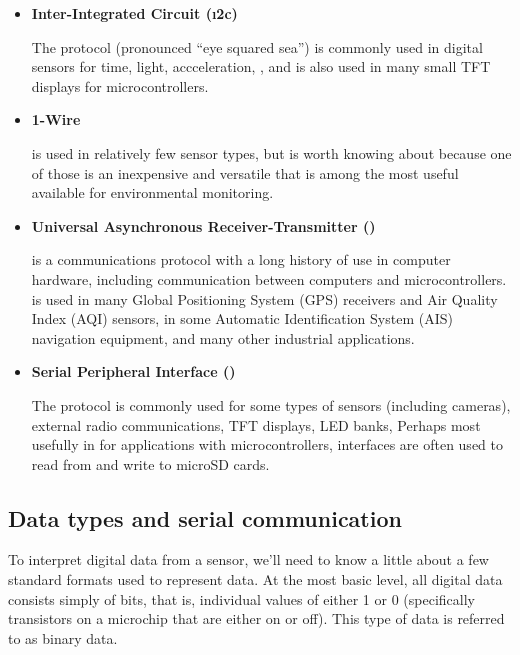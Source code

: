 \begin{itemize}
	\item \textbf{Inter-Integrated Circuit (\i2c)}

	The  protocol (pronounced ``eye squared sea'') is commonly used in digital sensors for time, light, accceleration, \etc, and is also used in many small TFT displays for microcontrollers.

	\item \textbf{1-Wire}

	  is used in relatively few sensor types, but is worth knowing about because one of those is an inexpensive and versatile  that is among the most useful available for environmental monitoring.


	\item \textbf{Universal Asynchronous Receiver-Transmitter (\uart)}

	 is a communications protocol with a long history of use in computer hardware, including communication between computers and microcontrollers.
	\uart is used in many Global Positioning System (GPS) receivers and Air Quality Index (AQI) sensors, in some Automatic Identification System (AIS) navigation equipment, and many other industrial applications.

	\item \textbf{Serial Peripheral Interface (\spi)}

	The  protocol is commonly used for some types of sensors (including cameras), external radio communications, TFT displays, LED banks, \etc
	Perhaps most usefully in for applications with microcontrollers, \spi interfaces are often used to read from and write to microSD cards.
\end{itemize}

\subsection{Data types and serial communication}

To interpret digital data from a sensor, we’ll need to know a little about a few standard formats used to represent data.  
At the most basic level, all digital data consists simply of bits, that is, individual values of either 1 or 0 (specifically transistors on a microchip that are either on or off).
This type of data is referred to as binary data.

